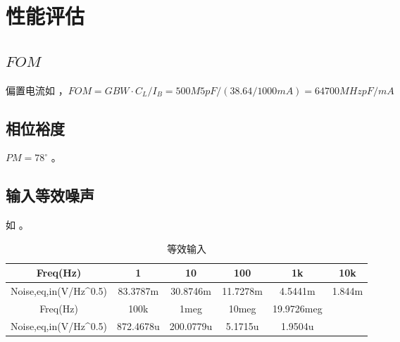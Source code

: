 \documentclass[lang=cn,11pt,a4paper,cite=authoryear]{elegantpaper}
\begin{document}

\section{性能评估}

\subsection{\(FOM\)}

偏置电流如  ，\(FOM = GBW \cdot C_L / I_B = 500 M 5 pF / (38.64 / 1000 mA) = 64700 MHz pF/mA\) 


\subsection{相位裕度}

\(PM = 78^\circ\) 。

\subsection{输入等效噪声}

如  。
\begin{table}[]
    \caption{等效输入}
    \centering
    \label{tab:my-tabletab:my-table}
    \begin{tabular}{|c|c|c|c|c|c}
    \hline
    Freq(Hz)                               & 1         & 10        & 100      & 1k         & \multicolumn{1}{c|}{10k}    \\ \hline
    Noise,eq,in(V/Hz\textasciicircum{}0.5) & 83.3787m  & 30.8746m  & 11.7278m & 4.5441m    & \multicolumn{1}{c|}{1.844m} \\ \hline
    Freq(Hz)                               & 100k      & 1meg      & 10meg    & 19.9726meg &                             \\ \cline{1-5}
    Noise,eq,in(V/Hz\textasciicircum{}0.5) & 872.4678u & 200.0779u & 5.1715u  & 1.9504u    &                             \\ \cline{1-5}
    \end{tabular}
\end{table}


\end{document}
